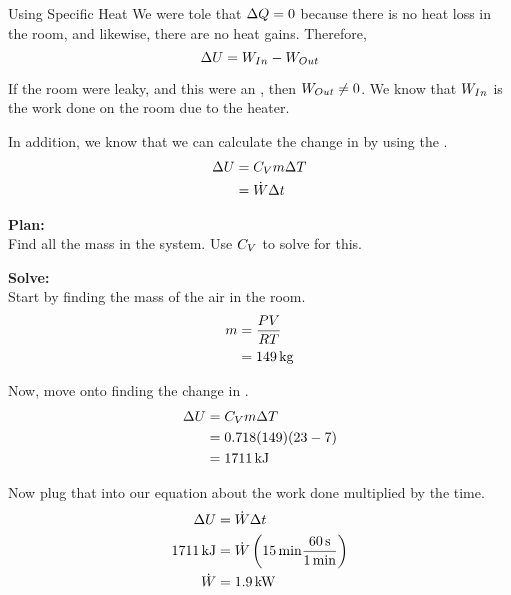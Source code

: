 \begin{example}{Using Specific Heat}
  We were tole that $\Delta Q = 0$ because there is no heat loss in the room, and likewise, there are no heat gains.
  Therefore,
  \begin{equation*}
    \Delta U = W_{In} - W_{Out}
  \end{equation*}

  If the room were leaky, and this were an , then $W_{Out} \neq 0$.
  We know that $W_{In}$ is the work done on the room due to the heater.

  In addition, we know that we can calculate the change in  by using the .
  \begin{align*}
    \Delta U &= C_{V} m \Delta T \\
    &= \dot{W} \Delta t
  \end{align*}

  \textbf{Plan:} \\
  Find all the mass in the system.
  Use $C_{V}$ to solve for this.

  \textbf{Solve:} \\
  Start by finding the mass of the air in the room.
  \begin{align*}
    m &= \frac{P V}{R T} \\
    &= \SI{149}{\kilo\gram}
  \end{align*}

  Now, move onto finding the change in .
  \begin{align*}
    \Delta U &= C_{V} m \Delta T \\
                             &= 0.718 (149) (23 - 7) \\
                             &= \SI{1711}{\kilo\joule}
  \end{align*}

  Now plug that into our equation about the work done multiplied by the time.
  \begin{align*}
    \Delta U &= \dot{W} \Delta t \\
    \SI{1711}{\kilo\joule} &= \dot{W} \left( \SI{15}{\minute} \frac{\SI{60}{\second}}{\SI{1}{\minute}} \right) \\
    \dot{W} &= \SI{1.9}{\kilo\watt}
  \end{align*}
\end{example}

